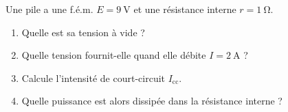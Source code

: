 \documentclass[11pt,a4paper]{article}
\begin{document}
\begin{exo}
Une pile a une f.é.m. $E=\qty{9}{\volt}$ et une résistance interne $r=\qty{1}{\ohm}$.
\begin{enumerate}[label=\alph*)]
  \item Quelle est sa tension à vide ?
  \item Quelle tension fournit-elle quand elle débite $I=\qty{2}{\ampere}$ ?
  \item Calcule l'intensité de court-circuit $I_{\text{cc}}$.
  \item Quelle puissance est alors dissipée dans la résistance interne ?
\end{enumerate}
\end{exo}
\end{document}
